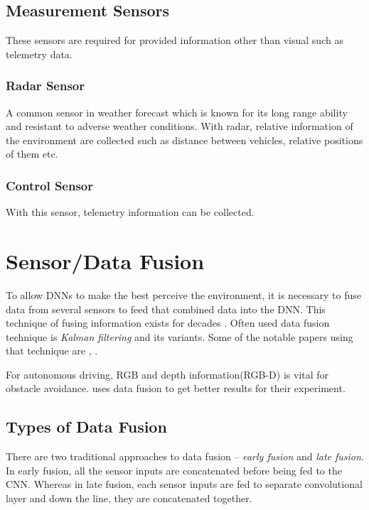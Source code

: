 \subsection{Measurement Sensors}
These sensors are required for provided information other than visual such as telemetry
data.
\subsubsection*{Radar Sensor}
A common sensor in weather forecast which is known for its long range ability and
resistant to adverse weather conditions. With radar, relative information of the
environment are collected such as distance between vehicles, relative positions of them
etc.
\subsubsection*{Control Sensor}
With this sensor, telemetry information can be collected.

\section{Sensor/Data Fusion}
To allow DNNs to make the best perceive the environment, it is necessary to fuse data from
several sensors to feed that combined data into the DNN. This technique of fusing
information exists for decades \cite{Datafusion1}. Often used data fusion technique is
\textit{Kalman filtering} and its variants. Some of the notable papers using that
technique are  \cite{Datafusion3}, \cite{Datafusion2}.

For autonomous driving, RGB and depth information(RGB-D) is vital for obstacle avoidance.
\cite{XiaoCodevillaMultimodalE2E} uses data fusion to get better results for their
experiment.
\subsection{Types of Data Fusion}
There are two traditional approaches to data fusion -- \textit{early fusion} and
\textit{late fusion}.
In early fusion, all the sensor inputs are concatenated before being fed to the CNN.
Whereas in late fusion, each sensor inputs are fed to separate convolutional layer and
down the line, they are concatenated together.

